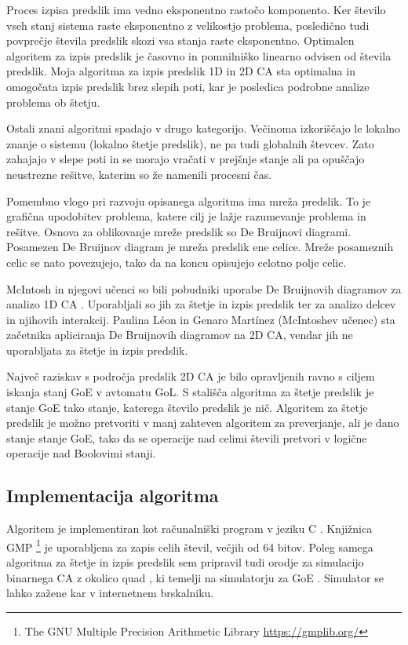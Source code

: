 \documentclass[12pt,a4paper,openany,twoside]{book}
\begin{document}
Proces izpisa predslik ima vedno eksponentno rastočo komponento.
Ker število vseh stanj sistema raste eksponentno z velikostjo problema,
posledično tudi povprečje števila predslik skozi vsa stanja raste eksponentno.
Optimalen algoritem za izpis predslik je časovno in pomnilniško linearno odvisen od števila predslik.
Moja algoritma za izpis predslik 1D in 2D CA sta optimalna in
omogočata izpis predslik brez slepih poti,
kar je posledica podrobne analize problema ob štetju.

Ostali znani algoritmi spadajo v drugo kategorijo.
Večinoma izkoriščajo le lokalno znanje o sistemu (lokalno štetje predslik),
ne pa tudi globalnih števcev.
Zato zahajajo v slepe poti in se morajo vračati v prejšnje stanje
ali pa opuščajo neustrezne rešitve, katerim so že namenili procesni čas.

Pomembno vlogo pri razvoju opisanega algoritma ima mreža predslik.
To je grafična upodobitev problema, katere cilj je lažje razumevanje problema in rešitve.
Osnova za oblikovanje mreže predslik so De Bruijnovi diagrami.
Posamezen De Bruijnov diagram je mreža predslik ene celice.
Mreže posameznih celic se nato povezujejo,
tako da na koncu opisujejo celotno polje celic.

McIntosh in njegovi učenci so bili pobudniki uporabe De Bruijnovih diagramov za analizo 1D CA \cite{McIntosh1991}.
Uporabljali so jih za štetje in izpis predslik ter za analizo delcev in njihovih interakcij.
Paulina Léon in Genaro Martínez (McIntoshev učenec) \cite{PaulinaGenaro2016}
sta začetnika apliciranja De Bruijnovih diagramov na 2D CA,
vendar jih ne uporabljata za štetje in izpis predslik.

Največ raziskav s področja predslik 2D CA je bilo opravljenih ravno s ciljem iskanja stanj GoE v avtomatu GoL.
S stališča algoritma za štetje predslik je stanje GoE tako stanje, katerega število predslik je nič.
Algoritem za štetje predslik je možno pretvoriti v manj zahteven algoritem za preverjanje, ali je dano stanje stanje GoE,
tako da se operacije nad celimi števili pretvori v logične operacije nad Boolovimi stanji.

\subsection{Implementacija algoritma}

Algoritem je implementiran kot računalniški program v jeziku C \cite{Jeras2016-algirithm}.
Knjižnica GMP \footnote{The GNU Multiple Precision Arithmetic Library \url{https://gmplib.org/}}
je uporabljena za zapis celih števil, večjih od 64 bitov.
Poleg samega algoritma za štetje in izpis predslik sem pripravil tudi
orodje za simulacijo binarnega CA z okolico quad \cite{Jeras2016-quad},
ki temelji na simulatorju za GoE \cite{webgl-gol}.
Simulator se lahko zažene kar v internetnem brskalniku.
\end{document}
